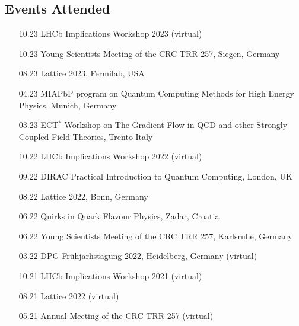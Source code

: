 \documentclass[10pt]{article} %
\begin{document}
\begin{paracol}{2}
\section{Events Attended}

\begin{itemize}[noitemsep,topsep=1pt,label=]
    \item [10.23] LHCb Implications Workshop 2023 (virtual)
    \item [10.23] Young Scientists Meeting of the CRC TRR 257, Siegen, Germany
    \item [08.23] Lattice 2023, Fermilab, USA
    \item [04.23] MIAPbP program on Quantum Computing Methods for High Energy Physics, Munich, Germany
    \item [03.23] ECT$^*$ Workshop on The Gradient Flow in QCD and other Strongly Coupled Field Theories, Trento Italy
    \item [10.22] LHCb Implications Workshop 2022 (virtual)
    \item [09.22] DIRAC Practical Introduction to Quantum Computing, London, UK
    \item [08.22] Lattice 2022, Bonn, Germany
    \item [06.22] Quirks in Quark Flavour Physics, Zadar, Croatia
    \item [06.22] Young Scientists Meeting of the CRC TRR 257, Karlsruhe, Germany
    \item [03.22] DPG Fr\"uhjarhstagung 2022, Heidelberg, Germany (virtual)
    \item [10.21] LHCb Implications Workshop 2021 (virtual)
    \item [08.21] Lattice 2022 (virtual)
    \item [05.21] Annual Meeting of the CRC TRR 257 (virtual) 
\end{itemize}


\switchcolumn %



\end{paracol}
\end{document}
